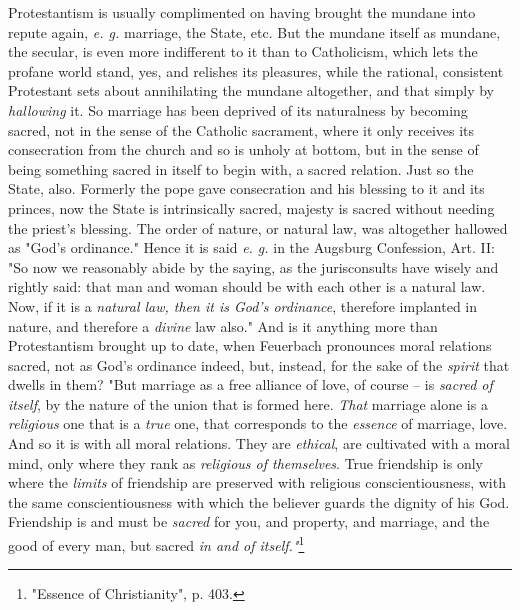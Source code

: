 Protestantism is usually complimented on having brought the mundane into 
repute again, \textit{e. g.} marriage, the State, etc. But the mundane itself 
as mundane, the secular, is even more indifferent to it than to Catholicism, 
which lets the profane world stand, yes, and relishes its pleasures, while the 
rational, consistent Protestant sets about annihilating the mundane 
altogether, and that simply by \textit{hallowing} it. So marriage has been 
deprived of its naturalness by becoming sacred, not in the sense of the 
Catholic sacrament, where it only receives its consecration from the church 
and so is unholy at bottom, but in the sense of being something sacred in 
itself to begin with, a sacred relation. Just so the State, also. Formerly the 
pope gave consecration and his blessing to it and its princes, now the State 
is intrinsically sacred, majesty is sacred without needing the priest's 
blessing. The order of nature, or natural law, was altogether hallowed as 
"{}God's ordinance."{} Hence it is said \textit{e. g.} in the Augsburg 
Confession, Art. II: "{}So now we reasonably abide by the saying, as the 
jurisconsults have wisely and rightly said: that man and woman should be with 
each other is a natural law. Now, if it is a \textit{natural law, then it is 
God's ordinance}, therefore implanted in nature, and therefore a 
\textit{divine} law also."{} And is it anything more than Protestantism 
brought up to date, when Feuerbach pronounces moral relations sacred, not as 
God's ordinance indeed, but, instead, for the sake of the \textit{spirit} that 
dwells in them? "{}But marriage as a free alliance of love, of course -- is 
\textit{sacred of itself}, by the nature of the union that is formed here. 
\textit{That} marriage alone is a \textit{religious} one that is a 
\textit{true} one, that corresponds to the \textit{essence} of marriage, love. 
And so it is with all moral relations. They are \textit{ethical}, are 
cultivated with a moral mind, only where they rank as \textit{religious of 
themselves}. True friendship is only where the \textit{limits} of friendship 
are preserved with religious conscientiousness, with the same 
conscientiousness with which the believer guards the dignity of his God. 
Friendship is and must be \textit{sacred} for you, and property, and marriage, 
and the good of every man, but sacred \textit{in and of 
itself."{}}\footnote{"{}Essence of Christianity"{}, p. 403.}

